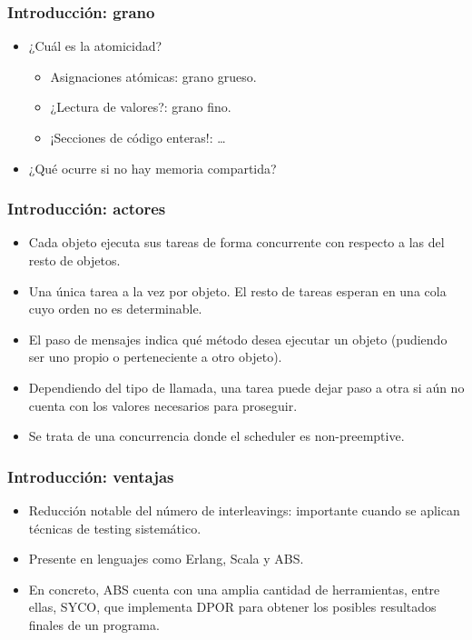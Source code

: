 \documentclass[spanish, a4paper, 12pt, final, slideColor, nototal, colorBG, pdf, noaccumulate, darkblue] {beamer}
\begin{document}
\begin{frame}
  \frametitle{Introducción: grano}
  \begin{itemize}
  \item ¿Cuál es la atomicidad?
    \begin{itemize}
    \item Asignaciones atómicas: grano grueso.
    \item ¿Lectura de valores?: grano fino.
    \item ¡Secciones de código enteras!: \dots
    \end{itemize}
  \item ¿Qué ocurre si no hay memoria compartida?
  \end{itemize}
\end{frame}

\begin{frame}
  \frametitle{Introducción: actores}
  \begin{itemize}
  \item Cada objeto ejecuta sus tareas de forma concurrente con respecto a las del resto de objetos.
  \item Una única tarea a la vez por objeto. El resto de tareas esperan en una cola cuyo orden no es determinable.
  \item El paso de mensajes indica qué método desea ejecutar un objeto (pudiendo ser uno propio o perteneciente a otro objeto).
  \item Dependiendo del tipo de llamada, una tarea puede dejar paso a otra si aún no cuenta con los valores necesarios para proseguir.
  \item Se trata de una concurrencia donde el scheduler es non-preemptive.
  \end{itemize}
\end{frame}

\begin{frame}
  \frametitle{Introducción: ventajas}
  \begin{itemize}
  \item Reducción notable del número de interleavings: importante cuando se aplican técnicas de testing sistemático.
  \item Presente en lenguajes como Erlang, Scala y ABS.
  \item En concreto, ABS cuenta con una amplia cantidad de herramientas, entre ellas, SYCO, que implementa DPOR para obtener los posibles resultados finales de un programa.
  \end{itemize}
\end{frame}
\end{document}

